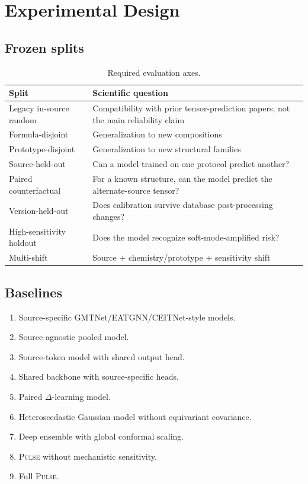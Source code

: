 \documentclass[11pt]{article}
\newcommand{\PULSE}{\textsc{Pulse}}
\begin{document}
\section{Experimental Design}

\subsection{Frozen splits}

\begin{table}[t]
\centering
\caption{Required evaluation axes.}
\label{tab:splits}
\begin{tabularx}{\linewidth}{lX}
\toprule
Split & Scientific question \\
\midrule
Legacy in-source random & Compatibility with prior tensor-prediction papers; not the main reliability claim \\
Formula-disjoint & Generalization to new compositions \\
Prototype-disjoint & Generalization to new structural families \\
Source-held-out & Can a model trained on one protocol predict another? \\
Paired counterfactual & For a known structure, can the model predict the alternate-source tensor? \\
Version-held-out & Does calibration survive database post-processing changes? \\
High-sensitivity holdout & Does the model recognize soft-mode-amplified risk? \\
Multi-shift & Source + chemistry/prototype + sensitivity shift \\
\bottomrule
\end{tabularx}
\end{table}

\subsection{Baselines}

\begin{enumerate}[leftmargin=1.5em]
    \item Source-specific GMTNet/EATGNN/CEITNet-style models.
    \item Source-agnostic pooled model.
    \item Source-token model with shared output head.
    \item Shared backbone with source-specific heads.
    \item Paired $\Delta$-learning model.
    \item Heteroscedastic Gaussian model without equivariant covariance.
    \item Deep ensemble with global conformal scaling.
    \item \PULSE{} without mechanistic sensitivity.
    \item Full \PULSE{}.
\end{enumerate}
\end{document}
